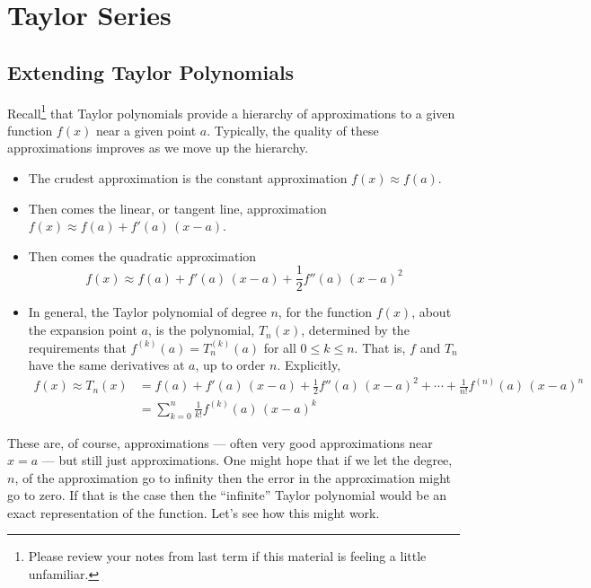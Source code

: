 \section{Taylor Series}

\subsection{Extending Taylor Polynomials}

Recall\footnote{Please review your notes from last term if this material
is feeling a little unfamiliar.} that Taylor polynomials provide a
hierarchy of approximations to a given function $f(x)$ near a given point $a$.
Typically, the quality of these approximations improves as we move
up the hierarchy.
\begin{itemize}
\item The crudest approximation is the constant approximation $f(x)\approx f(a)$.
\item Then comes the linear, or tangent line, approximation $f(x)\approx f(a) + f'(a)\,(x-a)$.

\item Then comes the quadratic approximation
\begin{equation*}
f(x)\approx f(a) + f'(a)\,(x-a) +\frac{1}{2} f''(a)\,(x-a)^2
\end{equation*}

\item In general, the Taylor polynomial of degree $n$, for the
function $f(x)$, about the expansion point $a$, is the
polynomial, $T_n(x)$,  determined by the requirements that $f^{(k)}(a) = T_n^{(k)}(a)$ for all $0\le k \le n$. That
is, $f$ and $T_n$ have the same derivatives at $a$, up to order $n$.
Explicitly,
\begin{align*}
f(x) \approx T_n(x) &= f(a) + f'(a)\,(x-a) +\frac{1}{2} f''(a)\,(x-a)^2
+\cdots+\frac{1}{n!} f^{(n)}(a)\,(x-a)^n \\
&=\sum_{k=0}^n\frac{1}{k!} f^{(k)}(a)\,(x-a)^k
\end{align*}
\end{itemize}
These are, of course, approximations --- often very good approximations near $x=a$ --- but still just approximations. One might hope that if we let
the degree, $n$, of the approximation go to infinity then the error in
the approximation might go to zero. If that is the case then the
``infinite'' Taylor polynomial would be an exact representation
of the function. Let's see how this might work.


